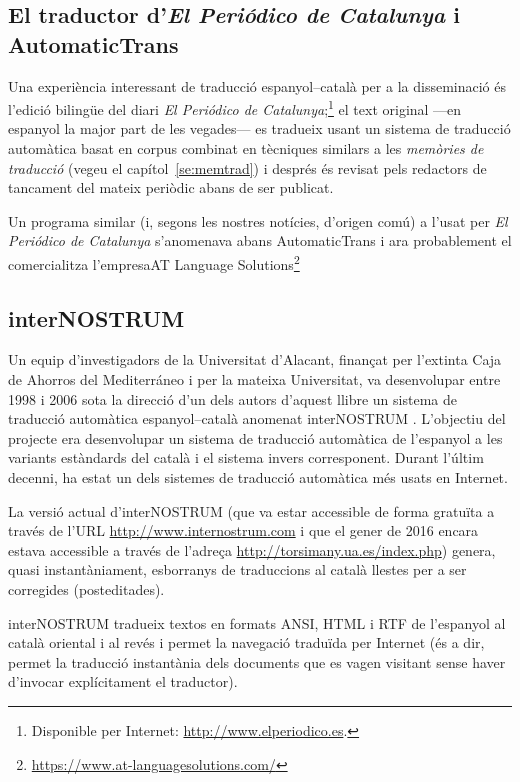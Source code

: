 \subsection{El traductor d'\emph{El Periódico de Catalunya} i AutomaticTrans}
\label{ss:ePdC}

Una experiència interessant \citep{fiteperiodico} de traducció
espanyol--català per a la disseminació és l'edició bilingüe del diari
\emph{El Periódico de Catalunya};\footnote{Disponible per Internet:
  \url{http://www.elperiodico.es}.} el text original ---en espanyol
la major part de les vegades--- es tradueix usant un sistema de
traducció automàtica basat en corpus combinat en tècniques similars a
les \emph{memòries de traducció} (vegeu el capítol~\ref{se:memtrad}) i
després és revisat pels redactors de tancament del mateix periòdic
abans de ser publicat.

Un programa similar (i, segons les nostres notícies, d'origen comú) a
l'usat per \emph{El Periódico de Catalunya} s'anomenava abans
AutomaticTrans i ara probablement el comercialitza l'empresaAT
Language
Solutions\footnote{\url{https://www.at-languagesolutions.com/}}


\subsection{interNOSTRUM}

Un equip d'investigadors de la Universitat d'Alacant, finançat per
l'extinta Caja de Ahorros del Mediterráneo i per la mateixa
Universitat, va desenvolupar entre 1998 i 2006 sota la direcció d'un
dels autors d'aquest llibre un sistema de traducció automàtica
espanyol--català anomenat \textsf{interNOSTRUM}
\citep{canals01a,canals01b}. L'objectiu del projecte era desenvolupar
un sistema de traducció automàtica de l'espanyol a les variants
estàndards del català i el sistema invers corresponent. Durant l'últim decenni, ha estat un dels sistemes de traducció automàtica més usats en Internet.

La versió actual d'{\sf interNOSTRUM} (que va estar accessible de forma
gratuïta a través de l'URL \url{http://www.internostrum.com} i que el
gener de 2016 encara estava accessible a través de l'adreça
\url{http://torsimany.ua.es/index.php}) genera, quasi instantàniament,
esborranys de traduccions al català llestes per a ser corregides
(posteditades). 

{\sf interNOSTRUM} tradueix textos en formats ANSI, HTML i RTF de
l'espanyol al català oriental i al revés i permet la navegació
traduïda per Internet (és a dir, permet la traducció instantània dels
documents que es vagen visitant sense haver d'invocar explícitament el
traductor).  

